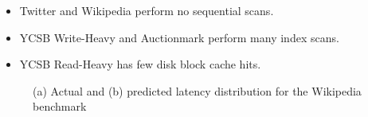 \begin{itemize}
  \item Twitter and Wikipedia perform no sequential scans.
  \item YCSB Write-Heavy and Auctionmark perform many index scans.
  \item YCSB Read-Heavy has few disk block cache hits.\\
\end{itemize}

\begin{figure}
\centering
{}

\caption{(a) Actual and (b) predicted latency distribution for the
  Wikipedia benchmark}
\label{fig:latency_wikipedia}
\end{figure}

